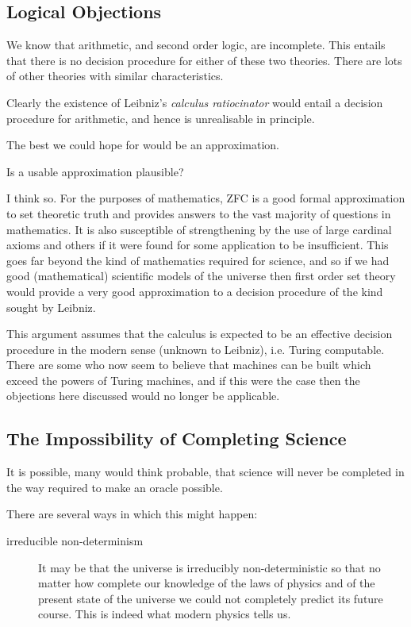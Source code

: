 \documentclass{rbjk}
\begin{document}
\begin{article}
\subsection{Logical Objections}

We know that arithmetic, and second order logic, are incomplete.
This entails that there is no decision procedure for either of these two theories.
There are lots of other theories with similar characteristics.

Clearly the existence of Leibniz's {\it calculus ratiocinator} would entail a decision procedure for arithmetic, and hence is unrealisable in principle.

The best we could hope for would be an approximation.

Is a usable approximation plausible?

I think so.
For the purposes of mathematics, ZFC is a good formal approximation to set theoretic truth and provides answers to the vast majority of questions in mathematics.
It is also susceptible of strengthening by the use of large cardinal axioms and others if it were found for some application to be insufficient.
This goes far beyond the kind of mathematics required for science, and so if we had good (mathematical) scientific models of the universe then first order set theory would provide a very good approximation to a decision procedure of the kind sought by Leibniz.

This argument assumes that the calculus is expected to be an effective decision procedure in the modern sense (unknown to Leibniz), i.e. Turing computable.
There are some who now seem to believe that machines can be built which exceed the powers of Turing machines, and if this were the case then the objections here discussed would no longer be applicable.

\subsection{The Impossibility of Completing Science}

It is possible, many would think probable, that science will never be completed in the way required to make an oracle possible.

There are several ways in which this might happen:

\begin{description}
\item [irreducible non-determinism]

It may be that the universe is irreducibly non-deterministic so that no matter how complete our knowledge of the laws of physics and of the present state of the universe we could not completely predict its future course.
This is indeed what modern physics tells us.


\end{description}
\end{article}
\end{document}
